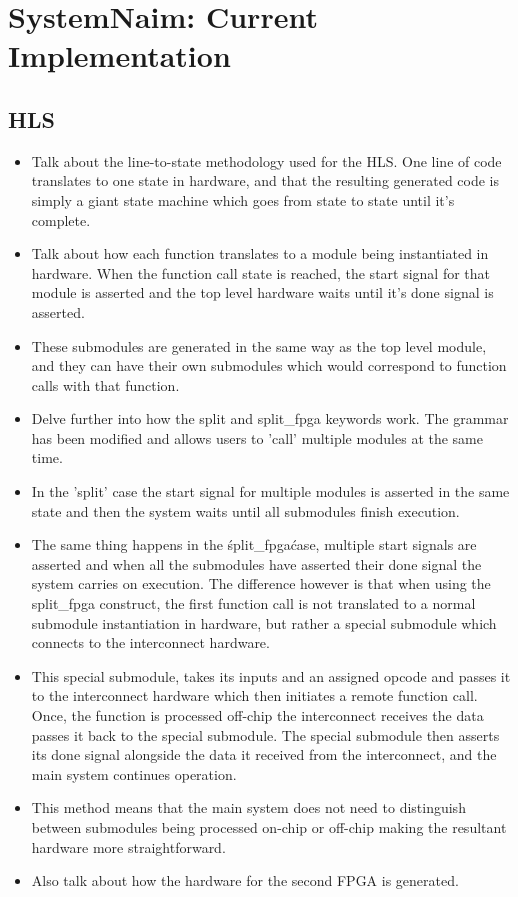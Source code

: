 \chapter{SystemNaim: Current Implementation}

\section{HLS}

\begin{itemize}
    \item Talk about the line-to-state methodology used for the HLS. One line of code translates to one state in hardware, and that the resulting generated code is simply a giant state machine which goes from state to state until it's complete.
    \item Talk about how each function translates to a module being instantiated in hardware. When the function call state is reached, the start signal for that module is asserted and the top level hardware waits until it's done signal is asserted.
    \item These submodules are generated in the same way as the top level module, and they can have their own submodules which would correspond to function calls with that function.
    \item Delve further into how the split and split\_fpga keywords work. The grammar has been modified and allows users to 'call' multiple modules at the same time.
    \item In the 'split' case the start signal for multiple modules is asserted in the same state and then the system waits until all submodules finish execution.
    \item The same thing happens in the \'split\_fpga\' case, multiple start signals are asserted and when all the submodules have asserted their done signal the system carries on execution. The difference however is that when using the split\_fpga construct, the first function call is not translated to a normal submodule instantiation in hardware, but rather a special submodule which connects to the interconnect hardware.
    \item This special submodule, takes its inputs and an assigned opcode and passes it to the interconnect hardware which then initiates a remote function call. Once, the function is processed off-chip the interconnect receives the data passes it back to the special submodule. The special submodule then asserts its done signal alongside the data it received from the interconnect, and the main system continues operation.
    \item This method means that the main system does not need to distinguish between submodules being processed on-chip or off-chip making the resultant hardware more straightforward.
    \item Also talk about how the hardware for the second FPGA is generated.
\end{itemize}

